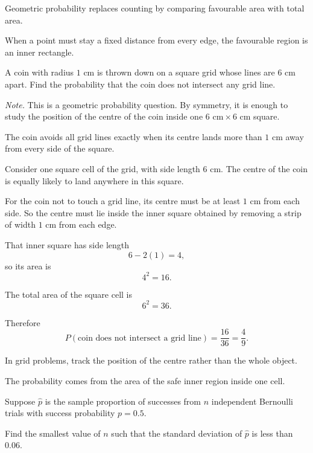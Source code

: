 \begin{takeaways}
\item Geometric probability replaces counting by comparing favourable area with total area.
\item When a point must stay a fixed distance from every edge, the favourable region is an inner rectangle.
\end{takeaways}

\begin{problem}
A coin with radius $1\text{ cm}$ is thrown down on a square grid whose lines are $6\text{ cm}$ apart. Find the probability that the coin does not intersect any grid line.
\end{problem}

\noindent\textit{Note.} This is a geometric probability question. By symmetry, it is enough to study the position of the centre of the coin inside one $6\text{ cm}\times 6\text{ cm}$ square.

\begin{hint}
The coin avoids all grid lines exactly when its centre lands more than $1\text{ cm}$ away from every side of the square.
\end{hint}

\begin{solution}
Consider one square cell of the grid, with side length $6$ cm. The centre of the coin is equally likely to land anywhere in this square.

For the coin not to touch a grid line, its centre must be at least $1$ cm from each side. So the centre must lie inside the inner square obtained by removing a strip of width $1$ cm from each edge.

That inner square has side length
\[
6-2(1)=4,
\]
so its area is
\[
4^2=16.
\]

The total area of the square cell is
\[
6^2=36.
\]

Therefore
\[
P(\text{coin does not intersect a grid line})
=\frac{16}{36}
=\frac49.
\]
\end{solution}

\begin{takeaways}
\item In grid problems, track the position of the centre rather than the whole object.
\item The probability comes from the area of the safe inner region inside one cell.
\end{takeaways}

\begin{problem}
Suppose $\hat p$ is the sample proportion of successes from $n$ independent Bernoulli trials with success probability $p=0.5$.

Find the smallest value of $n$ such that the standard deviation of $\hat p$ is less than $0.06$.
\end{problem}

